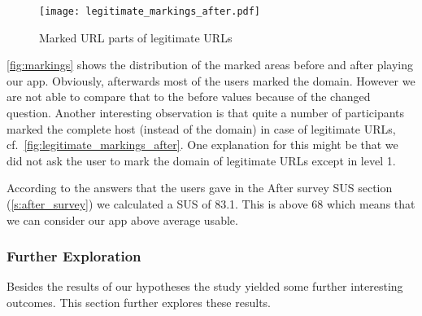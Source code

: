 \begin{description}[leftmargin=0cm]
\begin{figure}
\centering
\texttt{[image: legitimate\_markings\_after.pdf]}
\caption{Marked URL parts of legitimate URLs}
\label{fig:legitimate_markings_after}
\end{figure}
\autoref{fig:markings} shows the distribution of the marked areas before and after playing our app. Obviously, afterwards most of the users marked the domain. However we are not able to compare that to the before values because of the changed question.
Another interesting observation is that quite a number of participants marked the complete host (instead of the domain) in case of legitimate URLs, cf.~\autoref{fig:legitimate_markings_after}. One explanation for this might be that we did not ask the user to mark the domain of legitimate URLs except in level 1.
\item[Hypothesis 4]
According to the answers that the users gave in the After survey SUS section (\autoref{s:after_survey}) we calculated a SUS of 83.1. This is above 68 which means that we can consider our app above average usable.
\end{description}

\subsubsection{Further Exploration}
\label{s:further_exploration}
Besides the results of our hypotheses the study yielded some further interesting outcomes.
This section further explores these results.



